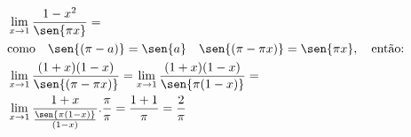 \begin{ex}
\begin{align}
&\lim_{x\rightarrow 1} \frac{1-x^2}{\sen{\pi x}}=\nonumber\\
&\text{como}\quad\sen{(\pi-a)}=\sen{a}\quad\sen{(\pi-\pi x)}=\sen{\pi x},\quad\text{então:}\nonumber\\
&\lim_{x\rightarrow 1}\frac{(1+x)(1-x)}{\sen{(\pi-\pi x)}}=\lim_{x\rightarrow 1} \frac{(1+x)(1-x)}{\sen{\pi(1-x)}}=\nonumber\\
&\lim_{x\rightarrow 1} \frac{1+x}{\frac{\sen{\pi(1-x)}}{(1-x)}}.\frac{\pi}{\pi}=\frac{1+1}{\pi}=\frac{2}{\pi}\nonumber
\end{align}
\end{ex}